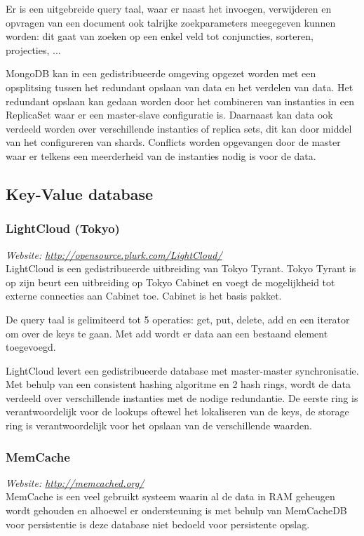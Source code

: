 Er is een uitgebreide query taal, waar er naast het invoegen, verwijderen en opvragen van een document ook talrijke zoekparameters meegegeven kunnen worden: dit gaat van zoeken op een enkel veld tot conjuncties, sorteren, projecties, ... 

MongoDB kan in een gedistribueerde omgeving opgezet worden met een opsplitsing tussen het redundant opslaan van data en het verdelen van data. Het redundant opslaan kan gedaan worden door het combineren van instanties in een ReplicaSet waar er een master-slave configuratie is. Daarnaast kan data ook verdeeld worden over verschillende instanties of replica sets, dit kan door middel van het configureren van shards. 
Conflicts worden opgevangen door de master waar er telkens een meerderheid van de instanties nodig is voor de data. 

\subsection{Key-Value database}
\subsubsection{LightCloud (Tokyo)}
\textit{Website: \url{http://opensource.plurk.com/LightCloud/}}\\
LightCloud is een gedistribueerde uitbreiding van Tokyo Tyrant. Tokyo Tyrant is op zijn beurt een uitbreiding op Tokyo Cabinet en voegt de mogelijkheid tot externe connecties aan Cabinet toe. Cabinet is het basis pakket. 

De query taal is gelimiteerd tot 5 operaties: get, put, delete, add en een iterator om over de keys te gaan. Met add wordt er data aan een bestaand element toegevoegd. 

LightCloud levert een gedistribueerde database met master-master synchronisatie. Met behulp van een consistent hashing algoritme en 2 hash rings, wordt de data verdeeld over verschillende instanties met de nodige redundantie. De eerste ring is verantwoordelijk voor de lookups oftewel het lokaliseren van de keys, de storage ring is verantwoordelijk voor het opslaan van de verschillende waarden. 

\subsubsection{MemCache}
\textit{Website: \url{http://memcached.org/}}\\
MemCache is een veel gebruikt systeem waarin al de data in RAM geheugen wordt gehouden en alhoewel er ondersteuning is met behulp van MemCacheDB voor persistentie is deze database niet bedoeld voor persistente opslag. 


